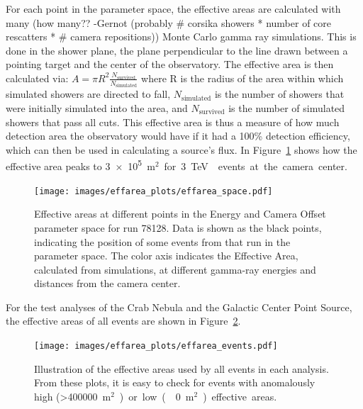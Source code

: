     For each point in the parameter space, the effective areas are calculated with many {\color{red}(how many?? -Gernot (probably # corsika showers * number of core rescatters * # camera repositions))} Monte Carlo gamma ray simulations.
    This is done in the shower plane, the plane perpendicular to the line drawn between a pointing target and the center of the observatory.
    The effective area is then calculated via:
    $A=\pi R^2 \frac{N_{\text{survived}}}{N_{\text{simulated}}}$
    where R is the radius of the area within which simulated showers are directed to fall, $N_{\text{simulated}}$ is the number of showers that were initially simulated into the area, and $N_{\text{survived}}$ is the number of simulated showers that pass all cuts.
    This effective area is thus a measure of how much detection area the observatory would have if it had a 100\% detection efficiency, which can then be used in calculating a source's flux.
    In Figure~\ref{fig:effarea_paramspace} shows how the effective area peaks to \nicetilde{}\SI{3e5}{m${}^2$} for \SI{3}{\TeV{}} events at the camera center.

    \begin{figure}[!t]
      \centering
      \texttt{[image: images/effarea\_plots/effarea\_space.pdf]}
      \caption[Effective Area Parameter Space]{
        Effective areas at different points in the Energy and Camera Offset parameter space for run 78128.
        Data is shown as the black points, indicating the position of some events from that run in the parameter space.
        The color axis indicates the Effective Area, calculated from simulations, at different gamma-ray energies and distances from the camera center.
      }
      \label{fig:effarea_paramspace}
    \end{figure}

    For the test analyses of the Crab Nebula and the Galactic Center Point Source, the effective areas of all events are shown in Figure~\ref{fig:effarea_usage}.

    \begin{figure}[!t]
      \centering
      \texttt{[image: images/effarea\_plots/effarea\_events.pdf]}
      \caption[Effective Areas Used]{
      Illustration of the effective areas used by all events in each analysis.
      From these plots, it is easy to check for events with anomalously high (>\SI{400000}{m${}^2$}) or low (\nicetilde\SI{0}{m${}^2$}) effective areas.
      }
      \label{fig:effarea_usage}
    \end{figure}
  
